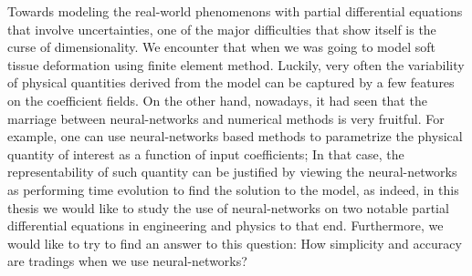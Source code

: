 \noindent 
Towards modeling the real-world phenomenons with partial differential equations that involve uncertainties, one of the major difficulties that show itself is the curse of dimensionality. We encounter that when we was going to model soft tissue deformation using finite element method. Luckily, very often the variability of physical quantities derived from the model can be captured by a few features on the coefficient fields. On the other hand, nowadays, it had seen that the marriage between neural-networks and numerical methods is very fruitful. For example, one can use neural-networks based methods to parametrize the physical quantity of interest as a function of input coefficients; In that case, the representability of such quantity can be justified by viewing the neural-networks as performing time evolution to find the solution to the model, as indeed, in this thesis we would like to study the use of neural-networks on two notable partial differential equations in engineering and physics to that end. Furthermore, we would like to try to find an answer to this question: How simplicity and accuracy are tradings when we use neural-networks?

